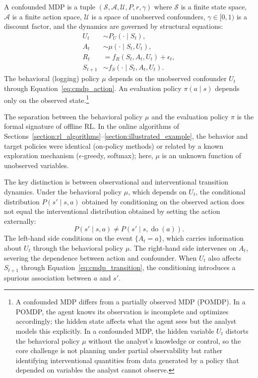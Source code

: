 \begin{definition}
\label{def:confounded_mdp}
A confounded MDP is a tuple $(\mathcal{S}, \mathcal{A}, \mathcal{U}, P, r, \gamma)$ where $\mathcal{S}$ is a finite state space, $\mathcal{A}$ is a finite action space, $\mathcal{U}$ is a space of unobserved confounders, $\gamma \in [0,1)$ is a discount factor, and the dynamics are governed by structural equations:
\begin{align}
U_t &\sim P_U(\cdot \mid S_t), \label{eq:cmdp_confounder} \\
A_t &\sim \mu(\cdot \mid S_t, U_t), \label{eq:cmdp_action} \\
R_t &= f_R(S_t, A_t, U_t) + \epsilon_t, \label{eq:cmdp_reward} \\
S_{t+1} &\sim f_S(\cdot \mid S_t, A_t, U_t). \label{eq:cmdp_transition}
\end{align}
The behavioral (logging) policy $\mu$ depends on the unobserved confounder $U_t$ through Equation~\eqref{eq:cmdp_action}. An evaluation policy $\pi(a \mid s)$ depends only on the observed state.\footnote{A confounded MDP differs from a partially observed MDP (POMDP). In a POMDP, the agent knows its observation is incomplete and optimizes accordingly; the hidden state affects what the agent sees but the analyst models this explicitly. In a confounded MDP, the hidden variable $U_t$ distorts the behavioral policy $\mu$ without the analyst's knowledge or control, so the core challenge is not planning under partial observability but rather identifying interventional quantities from data generated by a policy that depended on variables the analyst cannot observe.}
\end{definition}

The separation between the behavioral policy $\mu$ and the evaluation policy $\pi$ is the formal signature of offline RL. In the online algorithms of Sections~\ref{section:rl_algorithms}--\ref{section:illustrated_example}, the behavior and target policies were identical (on-policy methods) or related by a known exploration mechanism ($\epsilon$-greedy, softmax); here, $\mu$ is an unknown function of unobserved variables.

The key distinction is between observational and interventional transition dynamics. Under the behavioral policy $\mu$, which depends on $U_t$, the conditional distribution $P(s' \mid s, a)$ obtained by conditioning on the observed action does not equal the interventional distribution obtained by setting the action externally:
\begin{equation}
P(s' \mid s, a) \neq P(s' \mid s, \operatorname{do}(a)).
\label{eq:obs_vs_interventional}
\end{equation}
The left-hand side conditions on the event $\{A_t = a\}$, which carries information about $U_t$ through the behavioral policy $\mu$. The right-hand side intervenes on $A_t$, severing the dependence between action and confounder. When $U_t$ also affects $S_{t+1}$ through Equation~\eqref{eq:cmdp_transition}, the conditioning introduces a spurious association between $a$ and $s'$.

